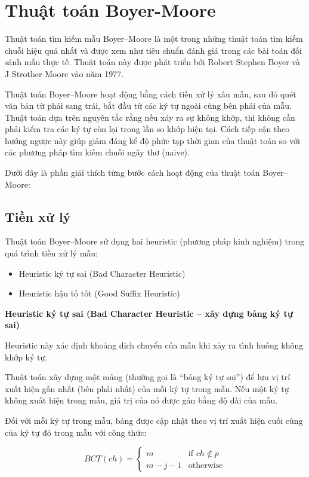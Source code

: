 \section{Thuật toán Boyer-Moore}

Thuật toán tìm kiếm mẫu Boyer–Moore là một trong những thuật toán tìm kiếm chuỗi hiệu quả nhất và được xem như tiêu chuẩn đánh giá trong các bài toán đối sánh mẫu thực tế. Thuật toán này được phát triển bởi Robert Stephen Boyer và J Strother Moore vào năm 1977.

Thuật toán Boyer–Moore hoạt động bằng cách tiền xử lý xâu mẫu, sau đó quét văn bản từ phải sang trái, bắt đầu từ các ký tự ngoài cùng bên phải của mẫu. Thuật toán dựa trên nguyên tắc rằng nếu xảy ra sự không khớp, thì không cần phải kiểm tra các ký tự còn lại trong lần so khớp hiện tại. Cách tiếp cận theo hướng ngược này giúp giảm đáng kể độ phức tạp thời gian của thuật toán so với các phương pháp tìm kiếm chuỗi ngây thơ (naive).

Dưới đây là phần giải thích từng bước cách hoạt động của thuật toán Boyer–Moore:

\subsection{Tiền xử lý}

Thuật toán Boyer–Moore sử dụng hai heuristic (phương pháp kinh nghiệm) trong quá trình tiền xử lý mẫu:

\begin{itemize}
    \item Heuristic ký tự sai (Bad Character Heuristic)
    \item Heuristic hậu tố tốt (Good Suffix Heuristic)
\end{itemize}

\textbf{Heuristic ký tự sai (Bad Character Heuristic – xây dựng bảng ký tự sai)}

Heuristic này xác định khoảng dịch chuyển của mẫu khi xảy ra tình huống không khớp ký tự.

Thuật toán xây dựng một mảng (thường gọi là “bảng ký tự sai”) để lưu vị trí xuất hiện gần nhất (bên phải nhất) của mỗi ký tự trong mẫu. Nếu một ký tự không xuất hiện trong mẫu, giá trị của nó được gán bằng độ dài của mẫu.

Đối với mỗi ký tự trong mẫu, bảng được cập nhật theo vị trí xuất hiện cuối cùng của ký tự đó trong mẫu với công thức:

\[
BCT(ch) =
\begin{cases}
m & \text{if } ch \notin p \\
m - j - 1 & \text{otherwise}
\end{cases}
\]

